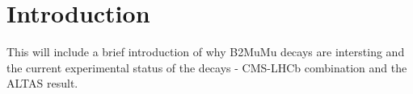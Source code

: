 \chapter{Introduction}


This will include a brief introduction of why B2MuMu decays are intersting and the current experimental status of the decays - CMS-LHCb combination and the ALTAS result.
